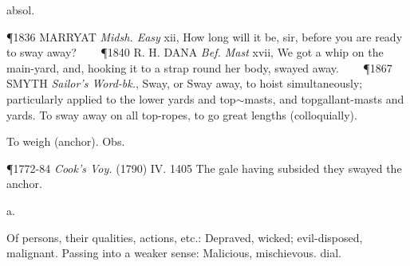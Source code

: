 \begin{description}[wide, labelwidth=!, labelindent=0pt]
\begin{myenumerate}
 absol.

\P 1836 MARRYAT  \textit{Midsh. Easy} xii, How long will it be, sir, before you are ready to sway away?    
\P 1840 R. H. DANA  \textit{Bef. Mast} xvii, We got a whip on the main-yard, and, hooking it to a strap round her body, swayed away.    
\P 1867 SMYTH  \textit{Sailor's Word-bk.}, Sway, or Sway away, to hoist simultaneously; particularly applied to the lower yards and top$\sim$masts, and topgallant-masts and yards. To sway away on all top-ropes, to go great lengths (colloquially).

 To weigh (anchor). Obs.

\P 1772-84 \textit{Cook's  Voy.} (1790) IV. 1405 The  gale having subsided they swayed the anchor.
\end{myenumerate}

 a.

\noindent {}

\vspace{-0.3cm}

\begin{myenumerate}

 Of persons, their qualities, actions, etc.: Depraved, wicked; evil-disposed, malignant. Passing into a weaker sense: Malicious, mischievous. dial.


\end{myenumerate}
\end{description}
